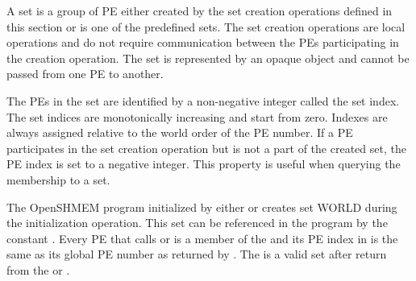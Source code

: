 A set is a group of \ac{PE} either created by the set creation operations defined in this section or is one of the predefined sets. The set creation operations are local operations and do not require communication between the \acp{PE} participating in the creation operation. The set is represented by an opaque object and cannot be passed from one \ac{PE} to another.

The \acp{PE} in the set are identified by a non-negative integer called the set index. The set indices are monotonically increasing and start from zero. Indexes are always assigned relative to the world order of the \ac{PE} number. If a \ac{PE} participates in the set creation operation but is not a part of the created set, the \ac{PE} index is set to a negative integer. This property is useful when querying the membership to a set.

The OpenSHMEM program initialized by either  or  creates set WORLD during the initialization operation. This set can be referenced in the program by the constant . Every \ac{PE} that calls  or  is a member of the  and its \ac{PE} index in  is the same as its global \ac{PE} number as returned by  . The  is a valid set after return from the  or . 
